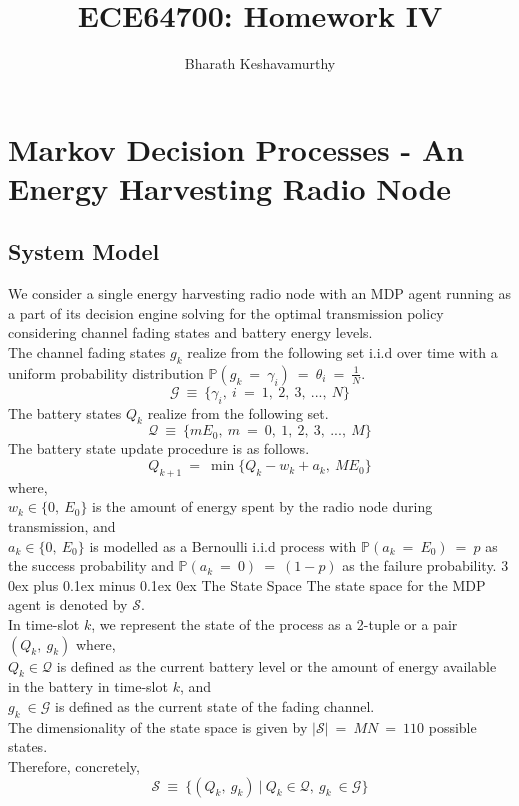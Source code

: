 \documentclass[12pt, draftcls, onecolumn]{IEEEtran}
\makeatletter
\def\subsubsection{\@startsection{subsubsection}%
                                 {3}%
                                 {\z@}%
                                 {0ex plus 0.1ex minus 0.1ex}%
                                 {0ex}%
                                 {\normalfont\normalsize\bfseries}}%
\makeatother
\begin{document}
 
\title{ECE64700: Homework IV}
\author{Bharath Keshavamurthy}
\maketitle
\section{Markov Decision Processes - An Energy Harvesting Radio Node}
\subsection{System Model}
We consider a single energy harvesting radio node with an MDP agent running as a part of its decision engine solving for the optimal transmission policy considering channel fading states and battery energy levels.
\\The channel fading states $g_k$ realize from the following set i.i.d over time with a uniform probability distribution $\mathbb{P}(g_k\ =\ \gamma_i)\ =\ \theta_i\ =\ \frac{1}{N}$.
\begin{equation}\label{1}
    \mathcal{G}\ \equiv\ \{\gamma_i,\ i\ =\ 1,\ 2,\ 3,\ ...,\ N\}
\end{equation}
The battery states $Q_k$ realize from the following set.
\begin{equation}\label{2}
    \mathcal{Q}\ \equiv\ \{m E_0,\ m\ =\ 0,\ 1,\ 2,\ 3,\ ...,\ M\}
\end{equation}
The battery state update procedure is as follows.
\begin{equation*}
    Q_{k+1}\ =\ \min\{Q_k - w_k + a_k,\ M E_0\}
\end{equation*}
where,
\\$w_k \in \{0,\ E_0\}$ is the amount of energy spent by the radio node during transmission, and
\\$a_k \in \{0,\ E_0\}$ is modelled as a Bernoulli i.i.d process with $\mathbb{P}(a_k\ =\ E_0)\ =\ p$ as the success probability and $\mathbb{P}(a_k\ =\ 0)\ =\ (1-p)$ as the failure probability.
\subsubsection{The State Space} The state space for the MDP agent is denoted by $\mathcal{S}$.
\\In time-slot $k$, we represent the state of the process as a 2-tuple or a pair $(Q_k,\ g_k)$ where,
\\$Q_k \in \mathcal{Q}$ is defined as the current battery level or the amount of energy available in the battery in time-slot $k$, and
\\$g_k\ \in \mathcal{G}$ is defined as the current state of the fading channel.
\\The dimensionality of the state space is given by $|\mathcal{S}|\ =\ MN\ =\ 110$ possible states.
\\Therefore, concretely,
\begin{equation}\label{3}
    \mathcal{S}\ \equiv\ \{(Q_k,\ g_k)\ |\ Q_k \in \mathcal{Q},\ g_k\ \in \mathcal{G}\}
\end{equation}
\end{document}
